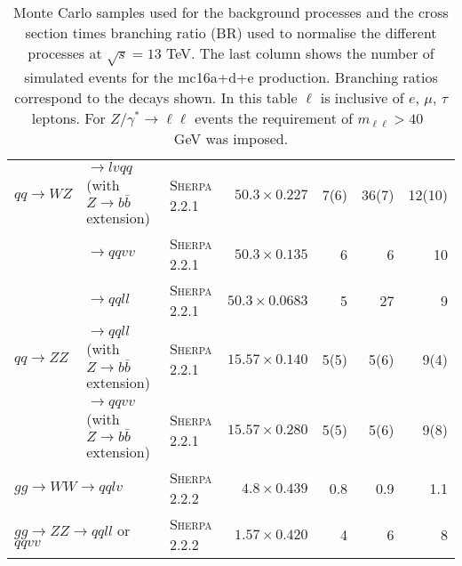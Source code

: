 \begin{table}[tbph]
{\begin{tabular}{lllrrrr}
    $qq\rightarrow WZ$ & $\rightarrow lvqq$ (with $Z\rightarrow b\bar{b}$ extension) & \textsc{Sherpa 2.2.1} & $50.3\times0.227$ & 7(6) & 36(7) & 12(10) \\
                                            & $\rightarrow qqvv$ & \textsc{Sherpa 2.2.1} & $50.3\times0.135$ & 6 & 6 & 10 \\
                                            & $\rightarrow qqll$ & \textsc{Sherpa 2.2.1} & $50.3\times0.0683$ & 5 & 27 & 9 \\
    $qq\rightarrow ZZ$ & $\rightarrow qqll$ (with $Z\rightarrow b\bar{b}$ extension) & \textsc{Sherpa 2.2.1} & $15.57\times0.140$ & 5(5)  & 5(6) & 9(4) \\
                                            & $\rightarrow qqvv$ (with $Z\rightarrow b\bar{b}$ extension) & \textsc{Sherpa 2.2.1} & $15.57\times0.280$ & 5(5)  & 5(6) & 9(8) \\
    \multicolumn{2}{l}{$gg\rightarrow WW \rightarrow qqlv$} & \textsc{Sherpa 2.2.2} & $4.8\times0.439$ & 0.8 & 0.9 & 1.1 \\
    \multicolumn{2}{l}{$gg\rightarrow ZZ \rightarrow qqll$ or $qqvv$} & \textsc{Sherpa 2.2.2} & $1.57\times0.420$ & 4 & 6 & 8 \\
    \bottomrule
  \end{tabular}
}
\caption{Monte Carlo samples used for the background processes and the cross
  section times branching ratio (BR) used to normalise the different processes
  at $\sqrt{s}=13$ TeV. The last column shows the number of simulated events for
  the {mc16a+d+e} production. Branching ratios correspond to the decays shown.
  In this table $\ell$ is inclusive of $e$, $\mu$, $\tau$ leptons. For
  $Z/\gamma^{*} \to \ell\ell$ events the requirement of $m_{\ell\ell}>40$~\\GeV
  was imposed.
}
\label{tab:bkgMC}
\end{table}
